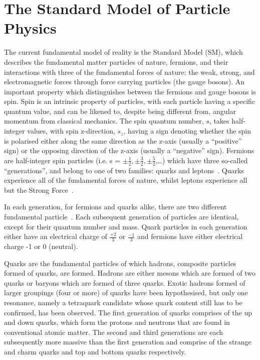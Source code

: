 \chapter{The Standard Model of Particle Physics}\label{chapter:sm}
The current fundamental model of reality is the Standard Model (SM), which describes the fundamental matter particles of nature, fermions, and their interactions with three of the fundamental forces of nature: the weak, strong, and electromagnetic forces through force carrying particles (the gauge bosons)\cite{LagrangiansSM}.
An important property which distinguishes between the fermions and gauge bosons is spin. 
Spin is an intrinsic property of particles, with each particle having a specific quantum value, and can be likened to, despite being different from, angular momentum from classical mechanics\cite{QM}. 
The spin quantum number, $s$,  takes half-integer values, with spin z-direction, $s_{z}$, having a sign denoting whether the spin is polarised either along the same direction as the z-axis (usually a ``positive'' sign) or the opposing direction of the z-axis (usually a ``negative'' sign)\cite{QM}. 
Fermions are half-integer spin particles (i.e. s = $\pm\frac{1}{2}, \pm\frac{3}{2},\pm\frac{5}{2}$,…) which have three so-called ``generations'', and belong to one of two families: quarks and leptons~\cite{ElectroweakStrong}. 
Quarks experience all of the fundamental forces of nature, whilst leptons experience all but the Strong Force~\cite{LagrangiansSM}. 

In each generation, for fermions and quarks alike, there are two different fundamental particle~\cite{LagrangiansSM}. 
Each subsequent generation of particles are identical, except for their quantum number and mass. 
Quark particles in each generation either have an electrical charge of $\frac{+2}{3}$ or $\frac{-1}{3}$ and fermions have either electrical charge -1 or 0 (neutral)\cite{ElectroweakStrong}. 

Quarks are the fundamental particles of which hadrons, composite particles formed of quarks, are formed. 
Hadrons are either mesons which are formed of two quarks or baryons which are formed of three quarks. 
Exotic hadrons formed of larger groupings (four or more) of quarks have been hypothesised, but only one resonance, namely a tetraquark candidate whose quark content still has to be confirmed, has been observed\cite{PhysRevLett.112.222002}. 
The first generation of quarks comprises of the up and down quarks, which form the protons and neutrons that are found in conventional atomic matter. 
The second and third generations are each subsequently more massive than the first generation and comprise of the strange and charm quarks and top and bottom quarks respectively. 

